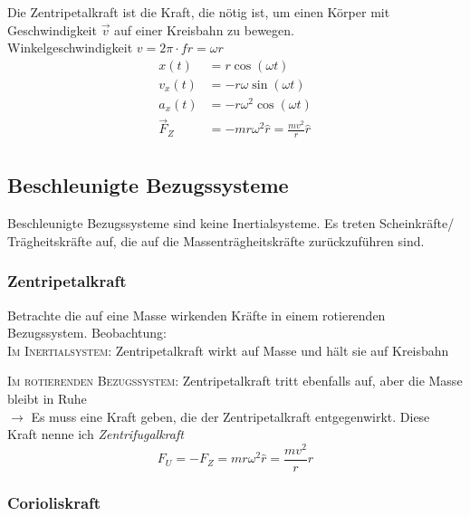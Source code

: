 \documentclass[a4paper,12pt]{report}
\begin{document}
Die Zentripetalkraft ist die Kraft, die nötig ist, um einen Körper mit Geschwindigkeit $\vec{v}$ auf einer Kreisbahn zu bewegen.\\

Winkelgeschwindigkeit $ v = 2 \pi \cdot  f r = \omega r $ \\

\begin{align*}
x(t) &= r \cos{(\omega t)} \\
v_x(t) &= -r \omega \sin{(\omega t)}\\
a_x(t) &= -r \omega^2 \cos{(\omega t)}\\
\vec{F}_Z &= - mr\omega^2\hat{r} = \frac{mv^2}{r}\hat{r} \\
\end{align*}

\subsection{Beschleunigte Bezugssysteme}
Beschleunigte Bezugssysteme sind keine Inertialsysteme. Es treten Scheinkräfte/ Trägheitskräfte  auf, die auf die Massenträgheitskräfte zurückzuführen sind.

\subsubsection{Zentripetalkraft}

Betrachte die auf eine Masse wirkenden Kräfte in einem rotierenden Bezugssystem. Beobachtung: \\

\textsc{Im Inertialsystem:} Zentripetalkraft wirkt auf Masse und hält sie auf Kreisbahn

\textsc{Im rotierenden Bezugssystem:} Zentripetalkraft tritt ebenfalls auf, aber die Masse bleibt in Ruhe \\

$\rightarrow$ Es muss eine Kraft geben, die der Zentripetalkraft entgegenwirkt. Diese Kraft nenne ich \emph{Zentrifugalkraft} \\ 

\begin{equation*}
F_U = -F_Z = mr\omega^2\hat{r} = \frac{mv^2}{r}\hat{r} 
\end{equation*}


\subsubsection{Corioliskraft}
\end{document}
